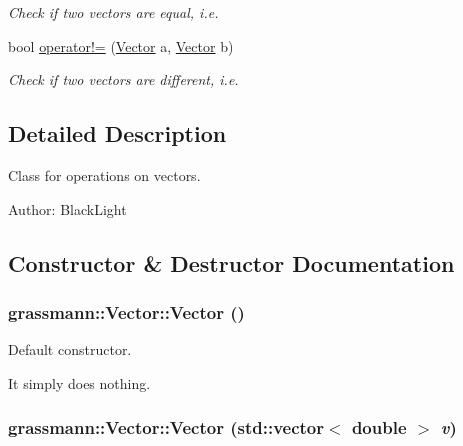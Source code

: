 \begin{CompactItemize}
\begin{CompactList}\small\item\em Check if two vectors are equal, i.e. \item\end{CompactList}\item 
bool \hyperlink{classgrassmann_1_1Vector_a73d83b4b0d593774cdbc7874ef72e81}{operator!=} (\hyperlink{classgrassmann_1_1Vector}{Vector} a, \hyperlink{classgrassmann_1_1Vector}{Vector} b)
\begin{CompactList}\small\item\em Check if two vectors are different, i.e. \item\end{CompactList}\end{CompactItemize}


\subsection{Detailed Description}
Class for operations on vectors. 

\begin{Desc}
\item[Author:]BlackLight \end{Desc}


\subsection{Constructor \& Destructor Documentation}
\hypertarget{classgrassmann_1_1Vector_aa833e1ac1753a65c2885a9ce88ffeff}{
\subsubsection[Vector]{\setlength{\rightskip}{0pt plus 5cm}grassmann::Vector::Vector ()}}
\label{classgrassmann_1_1Vector_aa833e1ac1753a65c2885a9ce88ffeff}


Default constructor. 

It simply does nothing. \hypertarget{classgrassmann_1_1Vector_d8278186455c0ecbe065541a6c18a768}{
\subsubsection[Vector]{\setlength{\rightskip}{0pt plus 5cm}grassmann::Vector::Vector (std::vector$<$ double $>$ {\em v})}}
\label{classgrassmann_1_1Vector_d8278186455c0ecbe065541a6c18a768}


